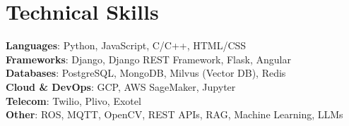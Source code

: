\documentclass[letterpaper,11pt]{article}
\makeatletter
\newcommand{\resumeSubheading}[4]{
  \vspace{-2pt}\item
    \begin{tabular*}{0.97\textwidth}[t]{l@{\extracolsep{\fill}}r}
      \textbf{#1} & #2 \\
      \textit{\small#3} & \textit{\small #4} \\
    \end{tabular*}\vspace{-7pt}
}
\newcommand{\resumeSubHeadingListStart}{\begin{itemize}[leftmargin=0.15in, label={}]}
\newcommand{\resumeSubHeadingListEnd}{\end{itemize}}
\makeatother
\begin{document}
\section{Technical Skills}
 \begin{itemize}[leftmargin=0.15in, label={}]
    \small{\item{
      \textbf{Languages}{: Python, JavaScript, C/C++, HTML/CSS} \\
      \textbf{Frameworks}{: Django, Django REST Framework, Flask, Angular} \\
      \textbf{Databases}{: PostgreSQL, MongoDB, Milvus (Vector DB), Redis} \\
      \textbf{Cloud \& DevOps}{: GCP, AWS SageMaker, Jupyter} \\
      \textbf{Telecom}{: Twilio, Plivo, Exotel} \\
      \textbf{Other}{: ROS, MQTT, OpenCV, REST APIs, RAG, Machine Learning, LLMs} \\
    }}
 \end{itemize}




\end{document}
